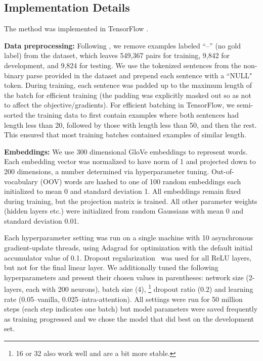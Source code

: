 \documentclass[11pt,letterpaper]{article}
\begin{document}
\subsection{Implementation Details}
The method was implemented in TensorFlow \cite{abaditensorflow}.

\textbf{Data preprocessing:} Following , we remove examples labeled ``--'' (no gold label) from the dataset, which leaves 549,367 pairs for training, 9,842 for development, and 9,824 for testing. We use the tokenized sentences from the non-binary parse provided in the dataset and prepend each sentence with a ``NULL" token. During training, each sentence was padded up to the maximum length of the batch for efficient training (the padding was explicitly masked out so as not to affect the objective/gradients). For efficient batching in TensorFlow, we semi-sorted the training data to first contain examples where both sentences had length less than 20, followed by those with length less than 50, and then the rest. This ensured that most training batches contained examples of similar length.

\textbf{Embeddings: } We use 300 dimensional GloVe embeddings \cite{pennington2014glove} to represent words. Each embedding vector was normalized to have  norm of 1 and projected down to 200 dimensions, a number determined via hyperparameter tuning. Out-of-vocabulary (OOV) words are hashed to one of 100 random embeddings each initialized to mean 0 and standard deviation 1. All embeddings remain fixed during training, but the projection matrix is trained. All other parameter weights (hidden layers etc.) were initialized from random Gaussians with mean 0 and standard deviation 0.01.

Each hyperparameter setting was run on a single machine with 10 asynchronous gradient-update threads, using Adagrad \cite{duchi2011adaptive} for optimization with the default initial accumulator value of 0.1. Dropout regularization~\cite{srivastava2014dropout} was used for all ReLU layers, but not for the final linear layer. We additionally tuned the following hyperparameters and present their chosen values in parentheses: network size (2-layers, each with 200 neurons), batch size (4), \footnote{16 or 32 also work well and are a bit more stable.} dropout ratio (0.2) and learning rate (0.05--vanilla, 0.025--intra-attention). All settings were run for 50 million steps (each step indicates one batch) but model parameters were saved frequently as training progressed and we chose the model that did best on the development set.
\end{document}
